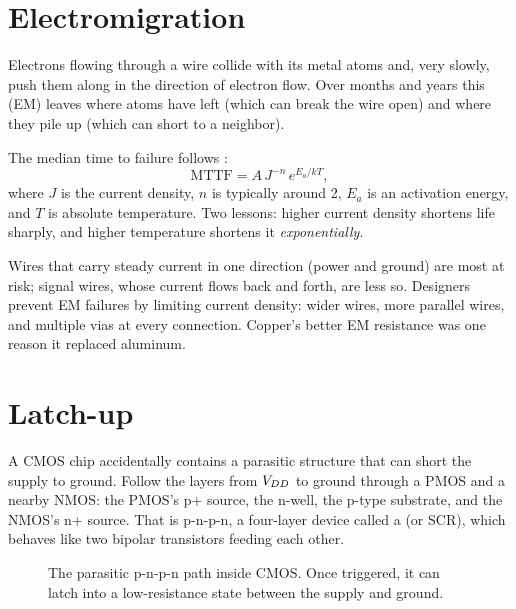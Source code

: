 \section{Electromigration}

Electrons flowing through a wire collide with its metal atoms and, very slowly, push them along in the direction of electron flow. Over months and years this  (EM) leaves  where atoms have left (which can break the wire open) and  where they pile up (which can short to a neighbor).

The median time to failure follows :
\[
  \text{MTTF} = A\,J^{-n}\,e^{E_a/kT},
\]
where $J$ is the current density, $n$ is typically around 2, $E_a$ is an activation energy, and $T$ is absolute temperature. Two lessons: higher current density shortens life sharply, and higher temperature shortens it \emph{exponentially}.

Wires that carry steady current in one direction (power and ground) are most at risk; signal wires, whose current flows back and forth, are less so. Designers prevent EM failures by limiting current density: wider wires, more parallel wires, and multiple vias at every connection. Copper's better EM resistance was one reason it replaced aluminum.

\section{Latch-up}

A CMOS chip accidentally contains a parasitic structure that can short the supply to ground. Follow the layers from $V_{DD}$ to ground through a PMOS and a nearby NMOS: the PMOS's p+ source, the n-well, the p-type substrate, and the NMOS's n+ source. That is p-n-p-n, a four-layer device called a  (or SCR), which behaves like two bipolar transistors feeding each other.

\begin{figure}[h]
\centering
{}
\caption{The parasitic p-n-p-n path inside CMOS. Once triggered, it can latch into a low-resistance state between the supply and ground.}
\end{figure}

